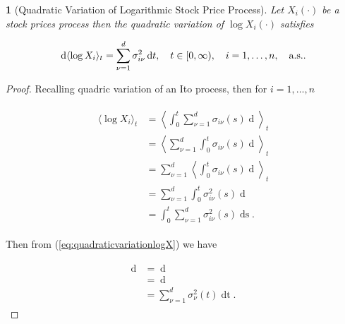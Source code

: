 \documentclass[british]{amsart} \usepackage{lmodern}
\numberwithin{equation}{section} \numberwithin{figure}{section}
\theoremstyle{plain} \newtheorem{thm}{\protect\theoremname}[section]
\theoremstyle{definition} \newtheorem{defn}[thm]{\protect\definitionname}
\theoremstyle{plain} \newtheorem{assumption}[thm]{\protect\assumptionname}
\theoremstyle{plain} \newtheorem{lem}[thm]{\protect\lemmaname}
\theoremstyle{plain} \newtheorem{prop}[thm]{\protect\propositionname}
\theoremstyle{remark} \newtheorem{rem}[thm]{\protect\remarkname}
\theoremstyle{plain} \newtheorem{cor}[thm]{\protect\corollaryname}
\renewcommand{\d}[1]{\mathop{\mathrm{d}{#1}}}
\newcommand{\rangei}{i=1,\dots,n} \newcommand{\measure}{\mathbb{P}}
\begin{document}
\begin{lem} [Quadratic Variation of Logarithmic Stock Price Process]

  Let $X_{i}(\cdot)$ be a stock prices process then the quadratic variation of
  $\log{X_{i}(\cdot)}$ satisfies

  \begin{equation} 
    \d{\langle \log{X_{i}} \rangle_{t}} = 
        \sum_{\nu=1}^{d} \sigma_{i\nu}^2\d{t}, 
    \quad \ranget, 
    \quad \rangei, 
    \quad \almostsurely.
  \end{equation} 

\end{lem}

\begin{proof} 

Recalling quadric variation of an Ito process, then for $\rangei$

  \begin{gather} 
    \begin{split} 
      \label{eq:quadraticvariationlogX} 
          \langle \log{X_{i}} \rangle_{t} 
& = \left< \int_{0}^{t} \sum_{\nu=1}^{d} \sigma_{i\nu}(s) \d{W_{\nu}(s)} \right>_{t} \\ 
& = \left< \sum_{\nu=1}^{d} \int_{0}^{t} \sigma_{i\nu}(s) \d{W_{\nu}(s)} \right>_{t} \\ 
& = \sum_{\nu=1}^{d} \left< \int_{0}^{t} \sigma_{i\nu}(s) \d{W_{\nu}(s)} \right>_{t} \\ 
& = \sum_{\nu=1}^{d} \int_{0}^{t} \sigma_{i\nu}^{2}(s) \d{\langle W_{\nu}(s) \rangle} \\
& = \int_{0}^{t} \sum_{\nu=1}^{d} \sigma_{i\nu}^{2}(s) \d{s}. 
    \end{split}
  \end{gather}
  
  Then from (\ref{eq:quadraticvariationlogX}) we have
  
  \begin{gather} 
    \begin{split} 
      \d{\langle \log{X} \rangle_{t}} 
& =\d{\left<\int_{0}^{t} \sum_{\nu=1}^{d} \sigma_{\nu}(s) \d{W_{\nu}(s)}\right>_{t}} \\ 
& = \d{\left(\int_{0}^{t} \sum_{\nu=1}^{d} \sigma_{\nu}^{2}(s) \d{s}\right)} \\ & = \sum_{\nu=1}^{d} \sigma_{\nu}^{2}(t)\d{t}.
    \end{split} 
  \end{gather}

\end{proof}
\end{document}
